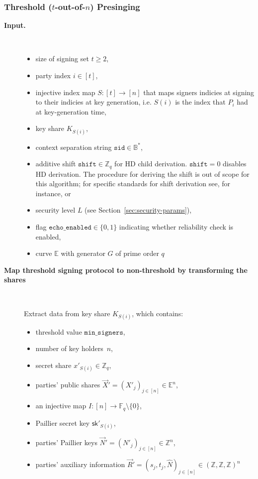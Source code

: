 \documentclass[11pt]{article}
\newcommand{\threshold}{\ensuremath{\mathtt{min\_signers}}}
\newcommand{\sid}{\ensuremath{\mathtt{sid}}}
\newcommand{\var}[1]{\ensuremath{\mathtt{#1}}}
\newcommand{\sk}{\textsf{sk}}
\newcommand{\Fq}{\mathbb{F}_q}
\newcommand{\E}{\mathbb{E}}
\newcommand{\Z}{\mathbb{Z}}
\newcommand{\?}[1]{\stackrel{?}{#1}}
\newcommand{\Bit}{\ensuremath{\{0{,}1\}}}
\newcommand{\Byte}{\ensuremath{\mathbb{B}}}
\begin{document}
\subsubsection{Threshold ($t$-out-of-$n$) Presinging}

\begin{description}

    \item[\bf Input.] \
    \begin{itemize}[noitemsep,topsep=0pt]
        \item size of signing set $t \ge 2$,
        \item party index $i \in [t]$,
        \item injective index map $S : [t] \to [n]$ that maps signers indicies at signing to their indicies at key generation, i.e. $S(i)$ is the index that $P_i$ had at key-generation time,
        \item key share $K_{S(i)}$,
        \item context separation string $\sid \in \Byte^*$,
        \item additive shift $\var{shift} \in \Z_q$ for HD child derivation. $\var{shift} = 0$ disables HD derivation. The procedure for deriving the shift is out of scope for this algorithm; for specific standards for shift derivation see, for instance, \cite{bip32} or \cite{slip10} \label{deriving-shift-note}
        \item security level $L$ (see Section~\ref{sec:security-params}),
        \item flag $\var{echo\_enabled} \in \Bit$ indicating whether reliability check is enabled,
        \item curve $\E$ with generator $G$ of prime order $q$
    \end{itemize}

    \item[\bf Map threshold signing protocol to non-threshold by transforming the shares] \
    \begin{algorithmic}[1]
        \State Extract data from key share $K_{S(i)}$, which contains:

        \begin{itemize}
        \item threshold value $\threshold$,
        \item number of key holders~$n$,
        \item secret share $x'_{S(i)} \in \Z_q$,
        \item parties' public shares $\vec X' = (X'_j)_{j \in [n]} \in \E^n$,
        \item an injective map $I : [n] \to \Fq \setminus \{0\}$,
        \item Paillier secret key $\sk'_{S(i)}$,
        \item parties' Paillier keys $\vec N' = (N'_j)_{j \in [n]} \in \Z^n$,
        \item parties' auxiliary information $\vec R' = (s_j, t_j, \hat N)_{j \in [n]} \in (\Z, \Z, \Z)^n$
        \end{itemize}


\end{algorithmic}
\end{description}
\end{document}
